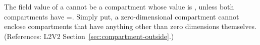 The  field value of a \Compartment cannot be a
compartment whose  value is ,
unless both compartments have =.
Simply put, a zero-dimensional compartment cannot enclose
compartments that have anything other than zero dimensions
themselves.  (References: L2V2
Section~\ref{sec:compartment-outside}.)
